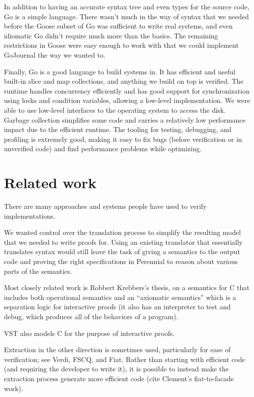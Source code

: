 In addition to having an accurate syntax tree and even types for the
source code, Go is a simple language. There wasn't much in the way of
syntax that we needed before the Goose subset of Go was sufficient to
write real systems, and even idiomatic Go didn't require much more than
the basics. The remaining restrictions in Goose were easy enough to work
with that we could implement GoJournal the way we wanted to.

Finally, Go is a good language to build systems in. It has efficient and
useful built-in slice and map collections, and anything we build on top
is verified. The runtime handles concurrency efficiently and has good
support for synchronization using locks and condition variables,
allowing a low-level implementation. We were able to use low-level
interfaces to the operating system to access the disk. Garbage
collection simplifies some code and carries a relatively low performance
impact due to the efficient runtime. The tooling for testing, debugging,
and profiling is extremely good, making it easy to fix bugs (before
verification or in unverified code) and find performance problems while
optimizing.

\section{Related work}

There are many approaches and systems people have used to verify
implementations.

We wanted control over the translation process to simplify the resulting
model that we needed to write proofs for. Using an existing translator
that essentially translates syntax would still leave the task of giving
a semantics to the output code and proving the right specifications in
Perennial to reason about various parts of the semantics.

Most closely related work is Robbert Krebbers's thesis, on a semantics
for C that includes both operational semantics and an ``axiomatic
semantics'' which is a separation logic for interactive proofs (it also
has an interpreter to test and debug, which produces all of the
behaviors of a program).

VST also models C for the purpose of interactive proofs.

Extraction in the other direction is sometimes used, particularly for ease of
verification; see Verdi, FSCQ, and Fiat. Rather than starting with efficient
code (and requiring the developer to write it), it is possible to instead make
the extraction process generate more efficient code (cite Clement's
fiat-to-facade work).

